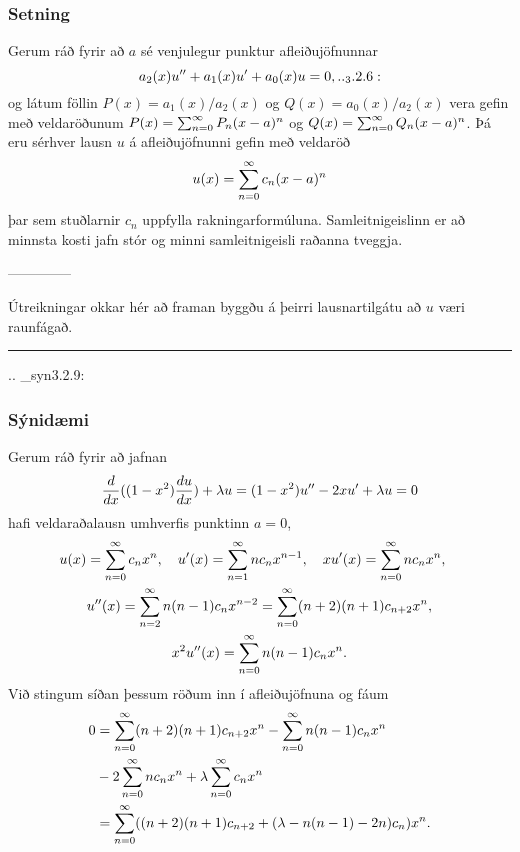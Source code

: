 \subsubsection{Setning}
Gerum ráð fyrir að $a$ sé venjulegur  punktur afleiðujöfnunnar 
 \begin{equation*}a_2(x)u\ddash+a_1(x)u\dash+a_0(x)u=0,


.. _3.2.6:

 \end{equation*}
og látum föllin $P(x)=a_1(x)/a_2(x)$ og $Q(x)=a_0(x)/a_2(x)$ 
vera gefin með velda\-röð\-unum 
$P(x)=\sum_{n=0}\sp \infty P_n(x-a)\sp n$
og $Q(x)= \sum_{n=0}\sp \infty Q_n(x-a)\sp n$.
Þá eru sérhver lausn $u$ á afleiðujöfnunni  gefin með veldaröð
 $$u(x)=\sum_{n=0}\sp \infty c_n(x-a)\sp n
 $$
þar sem stuðlarnir $c_n$  uppfylla rakningarformúluna.
Samleitnigeislinn er að minnsta kosti jafn stór og minni
samleitnigeisli raðanna tveggja.


--------------



Útreikningar okkar hér að framan byggðu á þeirri lausnartilgátu að $u$
væri raunfágað. 

\bigskip\hrule\bigskip


.. _syn3.2.9:

\subsubsection{Sýnidæmi}  Gerum ráð fyrir að jafnan
$$\dfrac {d}{dx}((1-x\sp 2)\dfrac{du}{dx})+\lambda u=
(1-x\sp 2)u{\sp{\prime\prime}}-2xu{\sp{\prime}}+\lambda u=0
$$
hafi veldaraðalausn umhverfis punktinn $a=0$, 
\begin{gather*}
u(x)=\sum\limits_{n=0}\sp\infty c_nx\sp n, \quad
u{\sp{\prime}}(x)=\sum\limits_{n=1}\sp\infty nc_nx\sp{n-1}, \quad 
xu{\sp{\prime}}(x)=\sum\limits_{n=0}\sp\infty nc_nx\sp n, \quad
\\
u{\sp{\prime\prime}}(x)
=\sum\limits_{n=2}\sp\infty n(n-1)c_nx\sp {n-2}=
\sum\limits_{n=0}\sp\infty (n+2)(n+1)c_{n+2}x\sp n,\\
x\sp 2u{\sp{\prime\prime}}(x)=\sum\limits_{n=0}\sp\infty n(n-1)c_nx\sp n.
\end{gather*}
Við stingum síðan þessum röðum inn í afleiðujöfnuna og fáum
\begin{align*}
0&=
\sum\limits_{n=0}\sp\infty (n+2)(n+1)c_{n+2}x\sp n -
\sum\limits_{n=0}\sp\infty n(n-1)c_nx\sp n\\
&-2\sum\limits_{n=0}\sp\infty nc_nx\sp n+
\lambda\sum\limits_{n=0}\sp\infty c_nx\sp n
\\
&=\sum\limits_{n=0}\sp\infty
((n+2)(n+1)c_{n+2} +(\lambda-n(n-1)-2n)c_n)x\sp n.
\end{align*}
 
